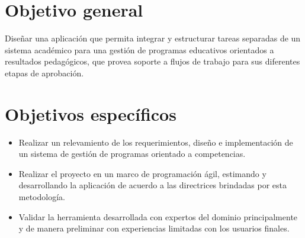 \section{Objetivo general}
Diseñar una aplicación que permita integrar y estructurar tareas separadas de un sistema académico para una gestión de programas educativos orientados a resultados pedagógicos, que provea soporte a flujos de trabajo para sus diferentes etapas de aprobación.


\section{Objetivos específicos}
  \begin{itemize}
    \item Realizar un relevamiento de los requerimientos, diseño e implementación de un sistema de gestión de programas orientado a competencias.
    \item Realizar el proyecto en un marco de programación ágil, estimando y desarrollando la aplicación de acuerdo a las directrices brindadas por esta metodología.
    \item Validar la herramienta desarrollada con expertos del dominio principalmente y de manera preliminar con experiencias limitadas con los usuarios finales.
  \end{itemize}